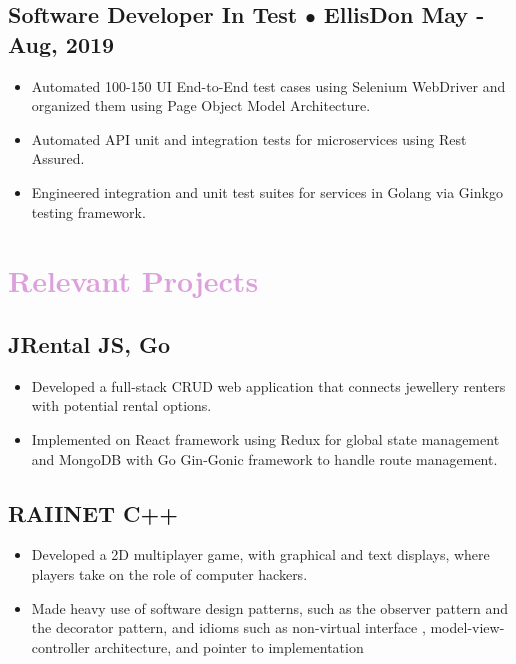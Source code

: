 \documentclass{article}
\begin{document}
	\subsection*{Software Developer In Test  {\color{Plum} {$\bullet$}} EllisDon \hfill {\normalsize May - Aug, 2019}}
		\begin{itemize}[label={\color{Plum} \faCaretRight}]
			\itemsep0em
			\item Automated 100-150 UI End-to-End test cases using Selenium WebDriver and organized them using Page Object Model Architecture. 
			\item Automated API unit and integration tests for microservices using Rest Assured.
			\item Engineered integration and unit test suites for services in Golang via Ginkgo testing framework. 
		\end{itemize}

\section*{\Large \faGears  {\hspace{0.5em}} {\textcolor{Plum} {Relevant Projects}}} 
		\subsection*{JRental {\small {\color{Plum} JS, Go}}}
			\begin{itemize}[label={\color{Plum} \faCaretRight}]
			\itemsep0em
			\item Developed a full-stack CRUD web application that connects jewellery renters with potential rental options.  
			\item Implemented on React framework using Redux for global state management and MongoDB with Go Gin-Gonic framework to handle route management. 
			\end{itemize}
		\subsection*{RAIINET {\small {\color{Plum} C++}}} 
			\begin{itemize}[label={\color{Plum} \faCaretRight}]
			\itemsep0em
			\item Developed a 2D multiplayer game, with graphical and text displays, where players take on the role of computer hackers. 
			\item Made heavy use of software design patterns, such as the observer pattern and the decorator pattern, and idioms such as non-virtual interface , model-view-controller architecture, and pointer to implementation
			\end{itemize}
\end{document}
